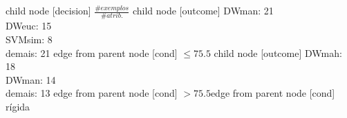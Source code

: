 child {node [decision] {$\frac{\#exemplos}{\#atrib.}$}
child {node [outcome] {
DWman: 21\\
DWeuc: 15\\
SVMsim: 8\\
demais: 21} edge from parent node [cond] {$\leq75.5$}}
child {node [outcome] {
DWmah: 18\\
DWman: 14\\
demais: 13} edge from parent node [cond] {$>75.5$}}edge from parent node [cond] {rígida}}
